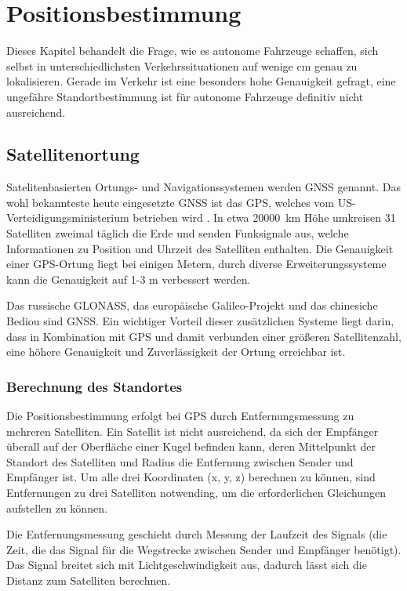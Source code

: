 \chapter{Positionsbestimmung}\label{kapitel-2}

Dieses Kapitel behandelt die Frage, wie es autonome Fahrzeuge schaffen, sich selbst in unterschiedlichsten Verkehrssituationen auf wenige \si{\centi\meter} genau zu lokalisieren. Gerade im Verkehr ist eine besonders hohe Genauigkeit gefragt, eine ungefähre Standortbestimmung ist für autonome Fahrzeuge definitiv nicht ausreichend.


\section{Satellitenortung}

Satelitenbasierten Ortungs- und Navigationssystemen werden \ac{GNSS} genannt. Das wohl bekannteste heute eingesetzte \ac{GNSS} ist das \ac{GPS}, welches vom US-Verteidigungsministerium betrieben wird . In etwa \SI{20000}{\kilo\meter} Höhe umkreisen 31 Satelliten zweimal täglich die Erde und senden Funksignale aus, welche Informationen zu Position und Uhrzeit des Satelliten enthalten. Die Genauigkeit einer \ac{GPS}-Ortung liegt bei einigen Metern, durch diverse Erweiterungssysteme kann die Genauigkeit auf 1-3 \si{\meter} verbessert werden.

Das russische GLONASS, das europäische Galileo-Projekt und das chinesiche Bediou sind \ac{GNSS}. Ein wichtiger Vorteil dieser zusätzlichen Systeme liegt darin, dass in Kombination mit \ac{GPS} und damit verbunden einer größeren Satellitenzahl, eine höhere Genauigkeit und Zuverlässigkeit der Ortung erreichbar ist.

\subsection{Berechnung des Standortes}

Die Positionsbestimmung erfolgt bei \ac{GPS} durch Entfernungsmessung zu mehreren Satelliten. Ein Satellit ist nicht ausreichend, da sich der Empfänger überall auf der Oberfläche einer Kugel befinden kann, deren Mittelpunkt der Standort des Satelliten und Radius die Entfernung zwischen Sender und Empfänger ist. Um alle drei Koordinaten (x, y, z) berechnen zu können, sind Entfernungen zu drei Satelliten notwending, um die erforderlichen Gleichungen aufstellen zu können.

Die Entfernungsmessung geschieht durch Messung der Laufzeit des Signals (\dH die Zeit, die das Signal für die Wegstrecke zwischen Sender und Empfänger benötigt). Das Signal breitet sich mit Lichtgeschwindigkeit aus, dadurch lässt sich die Distanz zum Satelliten berechnen.


